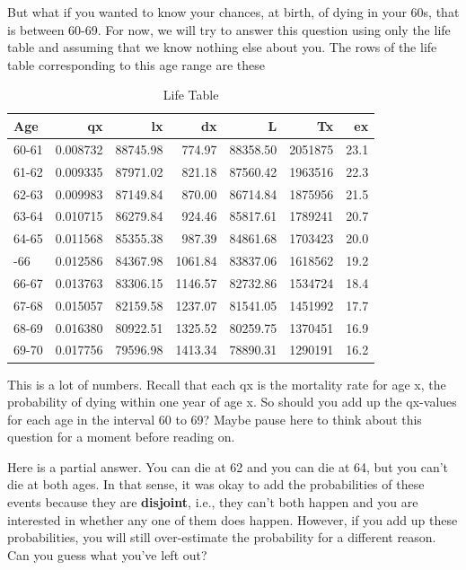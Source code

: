\documentclass[openany]{book}
\begin{document}
But what if you wanted to know your chances, at birth, of dying in your 60s, that is between 60-69. For now, we will try to answer this question using only the life table and assuming that we know nothing else about you. The rows of the life table corresponding to this age range are these

\begin{table}[!h]

\caption{\label{tab:survival}Life Table}
\centering
\begin{tabular}[t]{lrrrrrr}
\toprule
Age & qx & lx & dx & L & Tx & ex\\
\midrule
60-61 & 0.008732 & 88745.98 & 774.97 & 88358.50 & 2051875 & 23.1\\
61-62 & 0.009335 & 87971.02 & 821.18 & 87560.42 & 1963516 & 22.3\\
62-63 & 0.009983 & 87149.84 & 870.00 & 86714.84 & 1875956 & 21.5\\
63-64 & 0.010715 & 86279.84 & 924.46 & 85817.61 & 1789241 & 20.7\\
64-65 & 0.011568 & 85355.38 & 987.39 & 84861.68 & 1703423 & 20.0\\
\addlinespace
65-66 & 0.012586 & 84367.98 & 1061.84 & 83837.06 & 1618562 & 19.2\\
66-67 & 0.013763 & 83306.15 & 1146.57 & 82732.86 & 1534724 & 18.4\\
67-68 & 0.015057 & 82159.58 & 1237.07 & 81541.05 & 1451992 & 17.7\\
68-69 & 0.016380 & 80922.51 & 1325.52 & 80259.75 & 1370451 & 16.9\\
69-70 & 0.017756 & 79596.98 & 1413.34 & 78890.31 & 1290191 & 16.2\\
\bottomrule
\end{tabular}
\end{table}

This is a lot of numbers. Recall that each qx is the mortality rate for age x, the probability of dying within one year of age x. So should you add up the qx-values for each age in the interval 60 to 69? Maybe pause here to think about this question for a moment before reading on.

Here is a partial answer. You can die at 62 and you can die at 64, but you can't die at both ages. In that sense, it was okay to add the probabilities of these events because they are \textbf{disjoint}, i.e., they can't both happen and you are interested in whether any one of them does happen. However, if you add up these probabilities, you will still over-estimate the probability for a different reason. Can you guess what you've left out?
\end{document}
